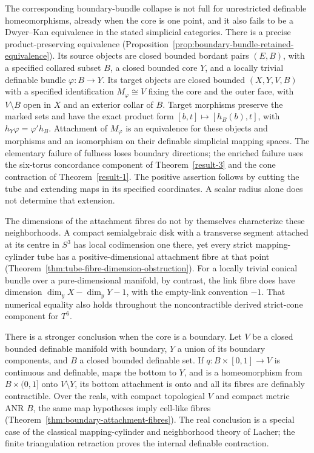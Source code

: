 \documentclass[11pt,a4paper]{article}
\theoremstyle{definition}
\begin{document}
The corresponding boundary-bundle collapse is not full for unrestricted
definable homeomorphisms, already when the core is one point, and it
also fails to be a Dwyer--Kan equivalence in the stated simplicial
categories. There is a precise product-preserving equivalence
(Proposition~\ref{prop:boundary-bundle-retained-equivalence}). Its
source objects are closed bounded bordant pairs $(E,B)$, with a
specified collared subset $B$, a closed bounded core $Y$, and a
locally trivial definable bundle $\varphi:B\to Y$. Its target objects
are closed bounded $(X,Y,V,B)$ with a specified identification
$M_\varphi\cong V$ fixing the core and the outer face, with
$V\setminus B$ open in $X$ and an exterior collar of $B$.
Target morphisms preserve the marked sets and have the exact product
form $[b,t]\mapsto[h_B(b),t]$, with
$h_Y\varphi=\varphi'h_B$. Attachment of $M_\varphi$ is an
equivalence for these objects and morphisms and an isomorphism on
their definable simplicial mapping spaces. The elementary failure
of fullness loses boundary directions; the enriched failure uses
the six-torus concordance component of Theorem~\ref{result-3} and
the cone contraction of Theorem~\ref{result-1}. The positive assertion
follows by cutting the tube and extending maps in its specified
coordinates. A scalar radius alone does not determine that extension.

The dimensions of the attachment fibres do not by themselves
characterize these neighborhoods. A compact semialgebraic disk
with a transverse segment attached at its centre in $S^3$ has
local codimension one there, yet every strict mapping-cylinder
tube has a positive-dimensional attachment fibre at that point
(Theorem~\ref{thm:tube-fibre-dimension-obstruction}). For a locally
trivial conical bundle over a pure-dimensional manifold, by
contrast, the link fibre does have dimension
$\dim_yX-\dim_yY-1$, with the empty-link convention $-1$.
That numerical equality also holds throughout the noncontractible
derived strict-cone component for $T^6$.

There is a stronger conclusion when the core is a boundary.
Let $V$ be a closed bounded definable manifold with boundary,
$Y$ a union of its boundary components, and $B$ a closed bounded
definable set. If $q:B\times[0,1]\to V$ is continuous and definable,
maps the bottom to $Y$, and is a homeomorphism from
$B\times(0,1]$ onto $V\setminus Y$, its bottom attachment is onto
and all its fibres are definably contractible. Over the reals,
with compact topological $V$ and compact metric ANR $B$, the same
map hypotheses imply cell-like fibres
(Theorem~\ref{thm:boundary-attachment-fibres}). The real conclusion
is a special case of the classical mapping-cylinder and neighborhood
theory of Lacher; the finite triangulation retraction proves the
internal definable contraction.
\end{document}
